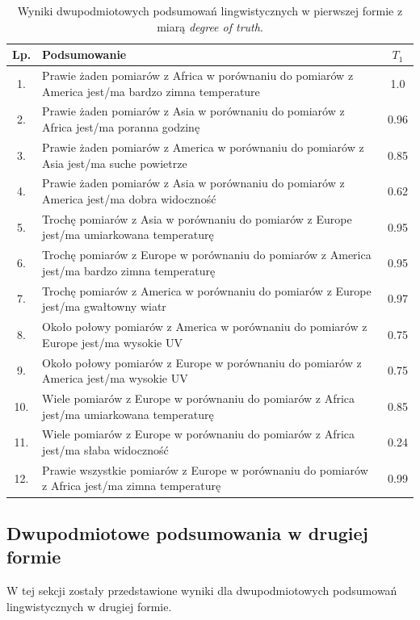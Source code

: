 \documentclass{article}
\begin{document}
\begin{table}[H]
\begin{center}
\normalsize %
\begin{tabular}{|c|p{10cm}|c|} %
\hline
\textbf{Lp.} & \textbf{Podsumowanie} & \textbf{\(T_1\)} \\ \hline
1. & Prawie żaden pomiarów z Africa w porównaniu do pomiarów z America jest/ma bardzo zimna temperature & 1.0 \\\hline
2. & Prawie żaden pomiarów z Asia w porównaniu do pomiarów z Africa jest/ma poranna godzinę & 0.96 \\\hline
3. & Prawie żaden pomiarów z America w porównaniu do pomiarów z Asia jest/ma suche powietrze & 0.85 \\\hline
4. & Prawie żaden pomiarów z Asia w porównaniu do pomiarów z America jest/ma dobra widoczność & 0.62 \\\hline
5. & Trochę pomiarów z Asia w porównaniu do pomiarów z Europe jest/ma umiarkowana temperaturę & 0.95 \\\hline
6. & Trochę pomiarów z Europe w porównaniu do pomiarów z America jest/ma bardzo zimna temperaturę & 0.95 \\\hline
7. & Trochę pomiarów z America w porównaniu do pomiarów z Europe jest/ma gwałtowny  wiatr & 0.97 \\\hline
8. & Około połowy pomiarów z America w porównaniu do pomiarów z Europe jest/ma wysokie UV & 0.75 \\\hline
9. & Około połowy pomiarów z Europe w porównaniu do pomiarów z America jest/ma wysokie UV & 0.75 \\\hline
10. & Wiele pomiarów z Europe w porównaniu do pomiarów z Africa jest/ma umiarkowana temperaturę & 0.85 \\\hline
11. & Wiele pomiarów z Europe w porównaniu do pomiarów z Africa jest/ma słaba widoczność & 0.24 \\\hline
12. & Prawie wszystkie pomiarów z Europe w porównaniu do pomiarów z Africa jest/ma zimna temperaturę & 0.99 \\\hline
\end{tabular}
\caption{Wyniki dwupodmiotowych podsumowań lingwistycznych w pierwszej formie z miarą \textit{degree of truth}.}
\end{center}
\end{table}

\subsection{Dwupodmiotowe podsumowania w drugiej formie}
W tej sekcji zostały przedstawione wyniki dla dwupodmiotowych podsumowań lingwistycznych w drugiej formie.
\end{document}
